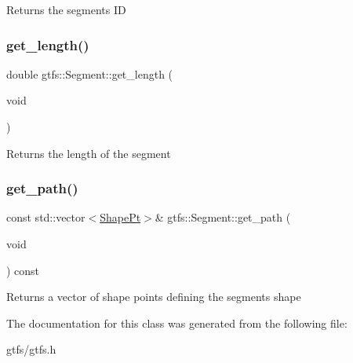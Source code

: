 \begin{DoxyReturn}{Returns}
the segment\textquotesingle{}s ID 
\end{DoxyReturn}
\mbox{\label{classgtfs_1_1Segment_a4f42ea597e18e54c9ec506697eb333a9}} 
\subsubsection{\texorpdfstring{get\+\_\+length()}{get\_length()}}
{\footnotesize\ttfamily double gtfs\+::\+Segment\+::get\+\_\+length (\begin{DoxyParamCaption}\item[{void}]{ }\end{DoxyParamCaption})\hspace{0.3cm}{\ttfamily [inline]}}

\begin{DoxyReturn}{Returns}
the length of the segment 
\end{DoxyReturn}
\mbox{\label{classgtfs_1_1Segment_a9ba2506020d090ccfcd0623b58101a3b}} 
\subsubsection{\texorpdfstring{get\+\_\+path()}{get\_path()}}
{\footnotesize\ttfamily const std\+::vector$<$\hyperlink{structgtfs_1_1ShapePt}{Shape\+Pt}$>$\& gtfs\+::\+Segment\+::get\+\_\+path (\begin{DoxyParamCaption}\item[{void}]{ }\end{DoxyParamCaption}) const\hspace{0.3cm}{\ttfamily [inline]}}

\begin{DoxyReturn}{Returns}
a vector of shape points defining the segment\textquotesingle{}s shape 
\end{DoxyReturn}


The documentation for this class was generated from the following file\+:\begin{DoxyCompactItemize}
\item 
gtfs/gtfs.\+h\end{DoxyCompactItemize}
